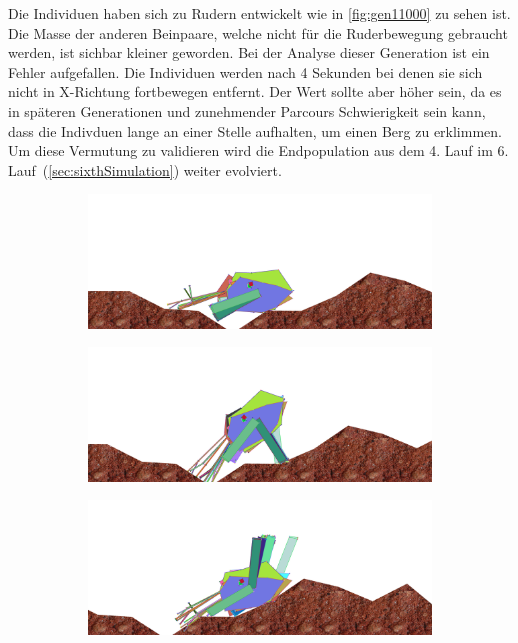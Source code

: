           Die Individuen haben sich zu Rudern entwickelt wie in \vref{fig:gen11000} zu sehen ist.
          Die Masse der anderen Beinpaare, welche nicht für die Ruderbewegung gebraucht werden, ist sichbar kleiner geworden.
          Bei der Analyse dieser Generation ist ein Fehler aufgefallen. Die Individuen werden nach 4 Sekunden bei denen sie sich nicht in X-Richtung fortbewegen entfernt.
          Der Wert sollte aber höher sein, da es in späteren Generationen und zunehmender Parcours Schwierigkeit sein kann, dass die Indivduen lange an einer Stelle aufhalten, um einen Berg zu erklimmen.
          Um diese Vermutung zu validieren wird die Endpopulation aus dem 4. Lauf im 6. Lauf~(\vref{sec:sixthSimulation}) weiter evolviert.
          \begin{figure}[H]
            \centering
            \begin{subfigure}[b]{0.45\textwidth}
              \includegraphics[width=\linewidth,center]{graphics/simulation-results/4_gen11000_1}
              \caption{\label{fig:gen11000_1}}
            \end{subfigure}
            \begin{subfigure}[b]{0.45\textwidth}
              \includegraphics[width=\linewidth,center]{graphics/simulation-results/4_gen11000_2}
              \caption{\label{fig:gen11000_2}}
            \end{subfigure}
            \begin{subfigure}[b]{0.45\textwidth}
              \includegraphics[width=\linewidth,center]{graphics/simulation-results/4_gen11000_3}

\end{subfigure}
\end{figure}
